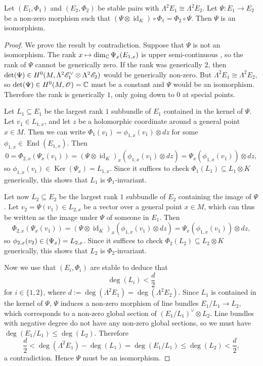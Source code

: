 \documentclass[A4paper, 12pt, british, reqno]{amsart}
\DeclareMathOperator{\End}{End}
\DeclareMathOperator{\id}{id}
\let\Im\relax
\DeclareMathOperator{\Im}{Im}
\DeclareMathOperator{\Ker}{Ker}
\newcommand{\ot}{\otimes}
\newcommand{\dual}{^{\vee}}
\begin{document}
\begin{lm}
    Let $(E_{1},\Phi_{1})$ and $(E_{2},\Phi_{2})$ be stable pairs with $\Lambda^{2}E_{1}\cong \Lambda^{2}E_{2}$.
    Let $\Psi\colon E_{1}\to E_{2}$ be a non-zero morphism such that $(\Psi\ot \id_{K}) \circ \Phi_{1}=\Phi_{2}\circ \Psi$.
    Then $\Psi$ is an isomorphism.
    \begin{proof}
	We prove the result by contradiction.
	Suppose that $\Psi$ is not an isomorphism.
	The rank $x\mapsto \dim_{\mathbb{C}}\Psi_{x}(E_{1,x})$ is upper semi-continuous \cite[Proposition 1.3.2]{ati89}, so the rank of $\Psi$ cannot be generically zero.
	If the rank was generically $2$, then $\det(\Psi)\in H^{0}(M,\Lambda^{2}\E_{1}\dual\ot\Lambda^{2}\E_{2})$ would be generically non-zero.
	But $\Lambda^{2}E_{1}\cong\Lambda^{2}E_{2}$, so $\det(\Psi)\in H^{0}(M,\mathscr{O})=\mathbb{C}$ must be a constant and $\Psi$ would be an isomorphism.
	Therefore the rank is generically $1$, only going down to $0$ at special points.

	Let $L_{1}\subseteq E_{1}$ be the largest rank $1$ subbundle of $E_{1}$ contained in the kernel of $\Psi$.
	Let $v_{1}\in L_{1,x}$, and let $z$ be a holomorphic coordinate around a general point $x\in M$.
	Then we can write $\Phi_{1}(v_{1})=\phi_{1,x}(v_{1})\ot dz$ for some $\phi_{1,x}\in \End(E_{1,x})$.
	Then
	\[ 0=\Phi_{2,x}(\Psi_{x}(v_{1}))=(\Psi\ot \id_{K})_{x}(\phi_{1,x}(v_{1})\ot dz)=\Psi_{x}(\phi_{1,x}(v_{1}))\ot dz, \]
	so $\phi_{1,x}(v_{1})\in \Ker(\Psi_{x})=L_{1,x}$.
	Since it suffices to check $\Phi_{1}(L_{1})\subseteq L_{1}\ot K$ generically, this shows that $L_{1}$ is $\Phi_{1}$-invariant.

	Let now $L_{2}\subseteq E_{2}$ be the largest rank $1$ subbundle of $E_{2}$ containing the image of $\Psi$.
	Let $v_{2}=\Psi(v_{1})\in L_{2,x}$ be a vector over a general point $x\in M$, which can thus be written as the image under $\Psi$ of someone in $E_{1}$.
	Then
	\[ \Phi_{2,x}(\Psi_{x}(v_{1}))=(\Psi\ot \id_{K})_{x}(\phi_{1,x}(v_{1})\ot dz)=\Psi_{x}(\phi_{1,x}(v_{1}))\ot dz, \]
	so $\phi_{2,x}(v_{2})\in \Im(\Psi_{x})=L_{2,x}$.
	Since it suffices to check $\Phi_{2}(L_{2})\subseteq L_{2}\ot K$ generically, this shows that $L_{2}$ is $\Phi_{2}$-invariant.

	Now we use that $(E_{i},\Phi_{i})$ are stable to deduce that
	\[ \deg(L_{i})<\frac{d}{2} \]
	for $i\in \{1,2\}$, where $d:=\deg(\Lambda^{2}E_{1})=\deg(\Lambda^{2}E_{2})$.
	Since $L_{1}$ is contained in the kernel of $\Psi$, $\Psi$ induces a non-zero morphism of line bundles $E_{1}/L_{1}\to L_{2}$, which corresponds to a non-zero global section of $(E_{1}/L_{1})\dual\ot L_{2}$.
	Line bundles with negative degree do not have any non-zero global sections, so we must have $\deg(E_{1}/L_{1})\leqslant \deg(L_{2})$.
	Therefore
	\[ \frac{d}{2}<\deg(\Lambda^{2}E_{1})-\deg(L_{1})=\deg(E_{1}/L_{1})\leqslant \deg(L_{2})<\frac{d}{2}, \]
	a contradiction.
	Hence $\Psi$ must be an isomorphism.
    \end{proof}
\end{lm}
\end{document}
